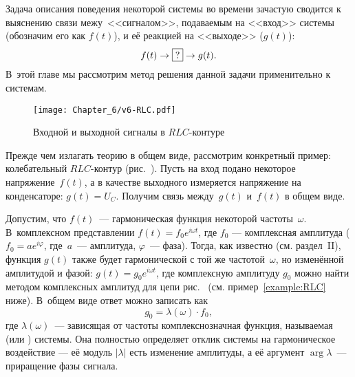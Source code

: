 
Задача описания поведения некоторой системы во времени зачастую сводится 
к выяснению связи межу~<<сигналом>>, подаваемым на <<вход>> системы 
(обозначим его как $f(t)$), и её реакцией на <<выходе>> ($g(t)$):
\begin{equation*}
f(t)\to\fbox{?} \to g(t).
\end{equation*}
В~этой главе мы рассмотрим  метод решения данной задачи применительно
к  системам.

\begin{wrapfigure}[10]{o}{0.3\textwidth}
    \centering
    \texttt{[image: Chapter\_6/v6-RLC.pdf]}
    \caption{Входной и выходной сигналы в $RLC$-контуре}
\end{wrapfigure}

Прежде чем излагать теорию в общем виде, рассмотрим конкретный пример:
колебательный $RLC$-кон\-ту\-р (рис.~).
Пусть на вход подано некоторое напряжение~$f(t)$,
а в качестве выходного измеряется напряжение на конденсаторе: $g(t) = U_C$. 
Получим связь между~$g(t)$ и~$f(t)$ в общем виде.

Допустим, что $f(t)$~--- гармоническая функция некоторой частоты~$\omega$.
В~комплексном представлении $f(t) = f_0 e^{i\omega t}$, где 
$f_0$ --- комплексная амплитуда ($f_0=ae^{i\varphi}$, 
где~$a$~--- амплитуда, $\varphi$~--- фаза).
Тогда, как известно (см. раздел~II),
функция $g(t)$ также будет гармонической с той же частотой~$\omega$, 
но изменённой амплитудой и фазой: $g(t) = g_0 e^{i\omega t}$, где
комплексную амплитуду $g_0$ можно найти методом комплексных амплитуд
для цепи рис.~ (см. пример~\ref{example:RLC} ниже).
В~общем виде ответ можно записать как
\begin{equation*}
g_0 = \lambda(\omega)\cdot f_0,
\end{equation*}
где $\lambda(\omega)$~--- зависящая от частоты комплекснозначная функция,
называемая  (или ) системы.
Она полностью определяет отклик системы на гармоническое воздействие 
--- её модуль $|\lambda|$ есть изменение амплитуды, а её аргумент
$\arg \lambda$~--- приращение фазы сигнала.

